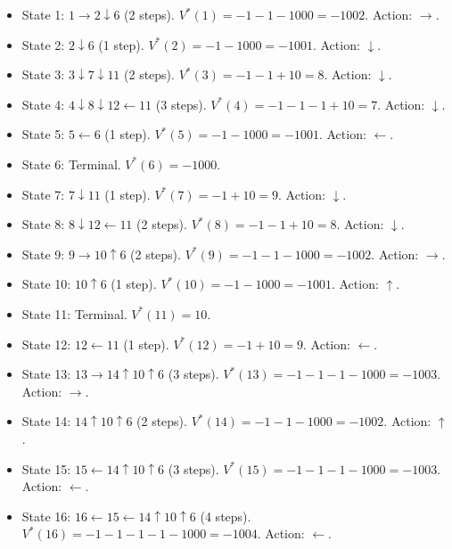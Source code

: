 \documentclass[a3paper,12pt]{extarticle} %
\begin{document}
\begin{enumerate}
\begin{itemize}
    \begin{itemize}
        \item State 1: \( 1 \rightarrow 2 \downarrow 6 \) (2 steps). \( V^*(1) = -1 - 1 - 1000 = -1002 \). Action: \( \rightarrow \).
        \item State 2: \( 2 \downarrow 6 \) (1 step). \( V^*(2) = -1 - 1000 = -1001 \). Action: \( \downarrow \).
        \item State 3: \( 3 \downarrow 7 \downarrow 11 \) (2 steps). \( V^*(3) = -1 - 1 + 10 = 8 \). Action: \( \downarrow \).
        \item State 4: \( 4 \downarrow 8 \downarrow 12 \leftarrow 11 \) (3 steps). \( V^*(4) = -1 - 1 - 1 + 10 = 7 \). Action: \( \downarrow \).
        \item State 5: \( 5 \leftarrow 6 \) (1 step). \( V^*(5) = -1 - 1000 = -1001 \). Action: \( \leftarrow \).
        \item State 6: Terminal. \( V^*(6) = -1000 \).
        \item State 7: \( 7 \downarrow 11 \) (1 step). \( V^*(7) = -1 + 10 = 9 \). Action: \( \downarrow \).
        \item State 8: \( 8 \downarrow 12 \leftarrow 11 \) (2 steps). \( V^*(8) = -1 - 1 + 10 = 8 \). Action: \( \downarrow \).
        \item State 9: \( 9 \rightarrow 10 \uparrow 6 \) (2 steps). \( V^*(9) = -1 - 1 - 1000 = -1002 \). Action: \( \rightarrow \).
        \item State 10: \( 10 \uparrow 6 \) (1 step). \( V^*(10) = -1 - 1000 = -1001 \). Action: \( \uparrow \).
        \item State 11: Terminal. \( V^*(11) = 10 \).
        \item State 12: \( 12 \leftarrow 11 \) (1 step). \( V^*(12) = -1 + 10 = 9 \). Action: \( \leftarrow \).
        \item State 13: \( 13 \rightarrow 14 \uparrow 10 \uparrow 6 \) (3 steps). \( V^*(13) = -1 - 1 - 1 - 1000 = -1003 \). Action: \( \rightarrow \).
        \item State 14: \( 14 \uparrow 10 \uparrow 6 \) (2 steps). \( V^*(14) = -1 - 1 - 1000 = -1002 \). Action: \( \uparrow \).
        \item State 15: \( 15 \leftarrow 14 \uparrow 10 \uparrow 6 \) (3 steps). \( V^*(15) = -1 - 1 - 1 - 1000 = -1003 \). Action: \( \leftarrow \).
        \item State 16: \( 16 \leftarrow 15 \leftarrow 14 \uparrow 10 \uparrow 6 \) (4 steps). \( V^*(16) = -1 - 1 - 1 - 1 - 1000 = -1004 \). Action: \( \leftarrow \).

\end{itemize}
\end{itemize}
\end{enumerate}
\end{document}
